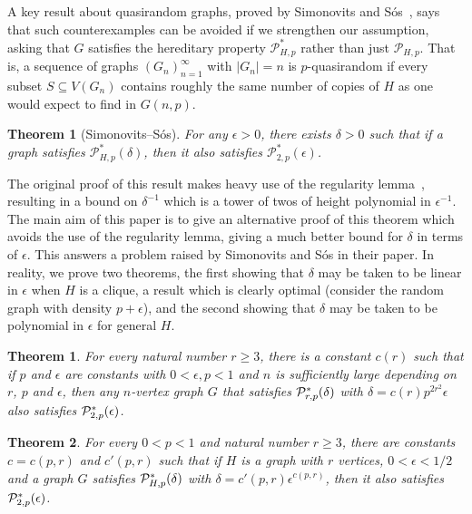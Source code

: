 \documentclass[11pt]{article}
\newtheorem{theorem}{Theorem}[section]
\newtheorem*{theorem*}{Theorem}
\begin{document}
A key result about quasirandom graphs, proved by Simonovits and S\'os~\cite{SS97}, says that such counterexamples can be avoided if we strengthen our assumption, asking that $G$ satisfies the hereditary property $\mathcal{P}_{H,p}^*$ rather than just $\mathcal{P}_{H,p}$. That is, a sequence of graphs $(G_n)_{n=1}^\infty$ with $|G_n| = n$ is $p$-quasirandom if every subset $S \subseteq V(G_n)$ contains roughly the same number of copies of $H$ as one would expect to find in $G(n,p)$.

\begin{theorem*}[Simonovits--S\'os]
For any $\epsilon > 0$, there exists $\delta > 0$ such that if a graph satisfies $\mathcal{P}_{H,p}^*(\delta)$, then it also satisfies $\mathcal{P}_{2, p}^*(\epsilon)$.
\end{theorem*}

The original proof of this result makes heavy use of the regularity lemma~\cite{Sz76}, resulting in a bound on $\delta^{-1}$ which is a tower of twos of height polynomial in $\epsilon^{-1}$. The main aim of this paper is to give an alternative proof of this theorem which avoids the use of the regularity lemma, giving a much better bound for $\delta$ in terms of $\epsilon$. This answers a problem raised by Simonovits and S\'os in their paper. In reality, we prove two theorems, the first showing that $\delta$ may be taken to be linear in $\epsilon$ when $H$ is a clique, a result which is clearly optimal (consider the random graph with density $p + \epsilon$), and the second showing that $\delta$ may be taken to be polynomial in $\epsilon$ for general $H$.

\begin{theorem}
\label{complete-graphs}
For every natural number $r \geq 3$, there is a constant $c(r)$ such that if $p$ and $\epsilon$ are constants with $0 < \epsilon, p < 1$ and $n$ is sufficiently large depending on $r$, $p$ and $\epsilon$, then any $n$-vertex graph $G$ that satisfies ${\cal P}^*_{r,p}(\delta)$ with $\delta = c(r) p^{2r^2} \epsilon$ also satisfies ${\cal P}^*_{2,p}(\epsilon)$. %
\end{theorem}

\begin{theorem}
\label{graphs-graphs}
For every $0<p<1$ and natural number $r \geq 3$, there are constants $c=c(p,r)$ and $c'(p,r)$ such that 
if $H$ is a graph with $r$ vertices, $0<\epsilon < 1/2$ and a graph $G$ satisfies
${\cal P}^*_{H,p}(\delta)$ with $\delta = c'(p,r) \epsilon^{c(p,r)}$, then it also satisfies ${\cal P}^*_{2,p}(\epsilon)$.
\end{theorem}
\end{document}
